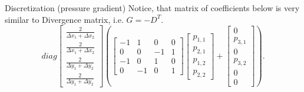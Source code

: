 \documentclass{beamer}
\begin{document}
	
	\begin{frame}{Discretization (pressure gradient)}
	Notice, that matrix of coefficients below is very similar to Divergence matrix, i.e. $G=-D^T$.
	\begin{equation}\label{eqn:gradient-matrix}
	diag\left[\begin{array}{cccccc}
	\frac{2}{\Delta x_1+\Delta x_2} \\
	\frac{2}{\Delta x_1+\Delta x_2} \\
	\frac{2}{\Delta y_1+\Delta y_2} \\
	\frac{2}{\Delta y_1+\Delta y_2}
	\end{array}\right]
	\left(\left[\begin{array}{rrrr}
	-1 & 1 & 0 & 0 \\
	0 & 0 & -1 & 1 \\
	-1 & 0 & 1 & 0 \\
	0 & -1 & 0 & 1
	\end{array}\right]
	\begin{bmatrix}{}
	  p_{1,1} \\
	  p_{2,1} \\
	  p_{1,2} \\
	  p_{2,2} 
	\end{bmatrix}
	+\left[\begin{array}{c}
	0 \\
	p_{3,1} \\
	0 \\
	 p_{3,2} \\
	0 \\
	0
	\end{array}\right]\right).
	\end{equation}
	\end{frame}
	
	

	
\end{document}
